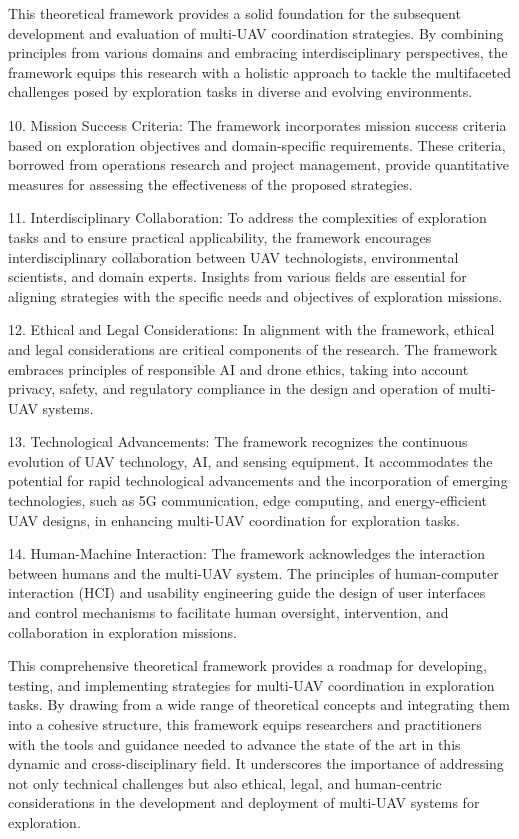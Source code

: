 \documentclass[sigconf]{acmart}
\begin{document}
This theoretical framework provides a solid foundation for the subsequent development and evaluation of multi-UAV coordination strategies. By combining principles from various domains and embracing interdisciplinary perspectives, the framework equips this research with a holistic approach to tackle the multifaceted challenges posed by exploration tasks in diverse and evolving environments.

10. Mission Success Criteria: The framework incorporates mission success criteria based on exploration objectives and domain-specific requirements. These criteria, borrowed from operations research and project management, provide quantitative measures for assessing the effectiveness of the proposed strategies.

11. Interdisciplinary Collaboration: To address the complexities of exploration tasks and to ensure practical applicability, the framework encourages interdisciplinary collaboration between UAV technologists, environmental scientists, and domain experts. Insights from various fields are essential for aligning strategies with the specific needs and objectives of exploration missions.

12. Ethical and Legal Considerations: In alignment with the framework, ethical and legal considerations are critical components of the research. The framework embraces principles of responsible AI and drone ethics, taking into account privacy, safety, and regulatory compliance in the design and operation of multi-UAV systems.

13. Technological Advancements: The framework recognizes the continuous evolution of UAV technology, AI, and sensing equipment. It accommodates the potential for rapid technological advancements and the incorporation of emerging technologies, such as 5G communication, edge computing, and energy-efficient UAV designs, in enhancing multi-UAV coordination for exploration tasks.

14. Human-Machine Interaction: The framework acknowledges the interaction between humans and the multi-UAV system. The principles of human-computer interaction (HCI) and usability engineering guide the design of user interfaces and control mechanisms to facilitate human oversight, intervention, and collaboration in exploration missions.

This comprehensive theoretical framework provides a roadmap for developing, testing, and implementing strategies for multi-UAV coordination in exploration tasks. By drawing from a wide range of theoretical concepts and integrating them into a cohesive structure, this framework equips researchers and practitioners with the tools and guidance needed to advance the state of the art in this dynamic and cross-disciplinary field. It underscores the importance of addressing not only technical challenges but also ethical, legal, and human-centric considerations in the development and deployment of multi-UAV systems for exploration.
\end{document}
